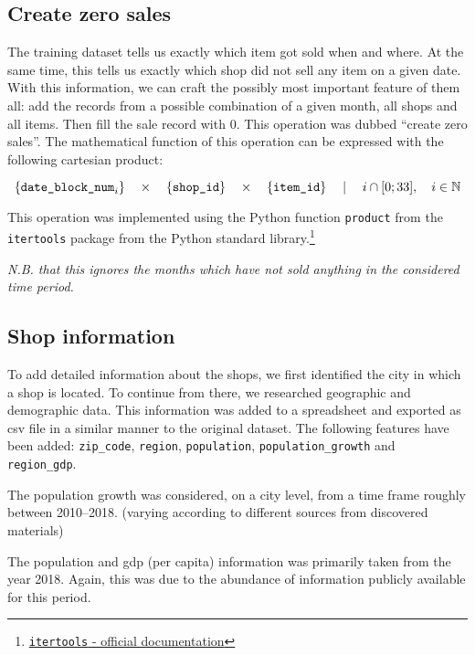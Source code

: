 \subsection{Create zero sales}\label{zerosales}

The training dataset tells us exactly which item got sold when and where. At the same time, this tells us exactly which shop did not sell any item on a given date.
With this information, we can craft the possibly most important feature of them all: add the records from a possible combination of a given month, all shops and all items. Then fill the sale record with 0. This operation was dubbed \enquote{create zero sales}.
The mathematical function of this operation can be expressed with the following cartesian product:

\vspace*{-4mm}
$$
\{\text{\texttt{date\_block\_num}}_i\}
\quad \times \quad
\{{\text{\texttt{shop\_id}}}\}
\quad  \times \quad 
\{{\text{\texttt{item\_id}}}\}
\quad \mid \quad
i \cap [0; 33], \quad i \in \mathbb{N}
$$

This operation was implemented using the Python function \texttt{product} from the \texttt{itertools} package from the Python standard library.\footnote{\href{https://docs.python.org/3/library/itertools.html\#itertools.product}{\texttt{itertools} - official documentation}}

\noindent \textit{N.B. that this ignores the months which have not sold anything in the considered time period.}

\subsection{Shop information}

To add detailed information about the shops, we first identified the city in which a shop is located. To continue from there, we researched geographic and demographic data. This information was added to a spreadsheet and exported as \acrfull{csv} file in a similar manner to the original dataset. The following features have been added: \texttt{zip\_code}, \texttt{region}, \texttt{population}, \texttt{population\_growth} and \texttt{region\_gdp}.

The population growth was considered, on a city level, from a time frame roughly between 2010--2018. (varying according to different sources from discovered materials)

The population and gdp (per capita) information was primarily taken from the year 2018. Again, this was due to the abundance of information publicly available for this period.

